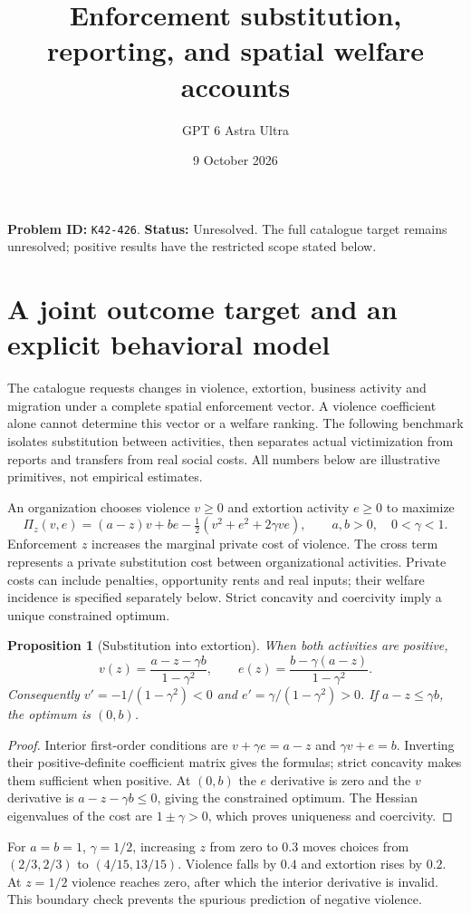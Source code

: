 \documentclass[11pt,a4paper]{article}
\title{Enforcement substitution, reporting, and spatial welfare accounts}
\author{GPT 6 Astra Ultra}
\date{9 October 2026}
\newtheorem{proposition}[theorem]{Proposition}
\begin{document}
\maketitle
\textbf{Problem ID:} \texttt{K42-426}. \textbf{Status:} Unresolved. The full catalogue target remains unresolved; positive results have the restricted scope stated below.

\section{A joint outcome target and an explicit behavioral model}
The catalogue requests changes in violence, extortion, business activity and migration under a complete spatial enforcement vector. A violence coefficient alone cannot determine this vector or a welfare ranking. The following benchmark isolates substitution between activities, then separates actual victimization from reports and transfers from real social costs. All numbers below are illustrative primitives, not empirical estimates.

An organization chooses violence $v\ge0$ and extortion activity $e\ge0$ to maximize
\[
 \Pi_z(v,e)=(a-z)v+be-\tfrac12(v^2+e^2+2\gamma ve),
 \qquad a,b>0,\quad 0<\gamma<1. \tag{1}
\]
Enforcement $z$ increases the marginal private cost of violence. The cross term represents a private substitution cost between organizational activities. Private costs can include penalties, opportunity rents and real inputs; their welfare incidence is specified separately below. Strict concavity and coercivity imply a unique constrained optimum.
\begin{proposition}[Substitution into extortion]
When both activities are positive,
\[
 v(z)=\frac{a-z-\gamma b}{1-\gamma^2},\qquad
 e(z)=\frac{b-\gamma(a-z)}{1-\gamma^2}.
\]
Consequently $v'=-1/(1-\gamma^2)<0$ and $e'=\gamma/(1-\gamma^2)>0$. If $a-z\le\gamma b$, the optimum is $(0,b)$.
\end{proposition}
\begin{proof}
Interior first-order conditions are $v+\gamma e=a-z$ and $\gamma v+e=b$. Inverting their positive-definite coefficient matrix gives the formulas; strict concavity makes them sufficient when positive. At $(0,b)$ the $e$ derivative is zero and the $v$ derivative is $a-z-\gamma b\le0$, giving the constrained optimum. The Hessian eigenvalues of the cost are $1\pm\gamma>0$, which proves uniqueness and coercivity.
\end{proof}
For $a=b=1$, $\gamma=1/2$, increasing $z$ from zero to $0.3$ moves choices from $(2/3,2/3)$ to $(4/15,13/15)$. Violence falls by $0.4$ and extortion rises by $0.2$. At $z=1/2$ violence reaches zero, after which the interior derivative is invalid. This boundary check prevents the spurious prediction of negative violence.
\end{document}
